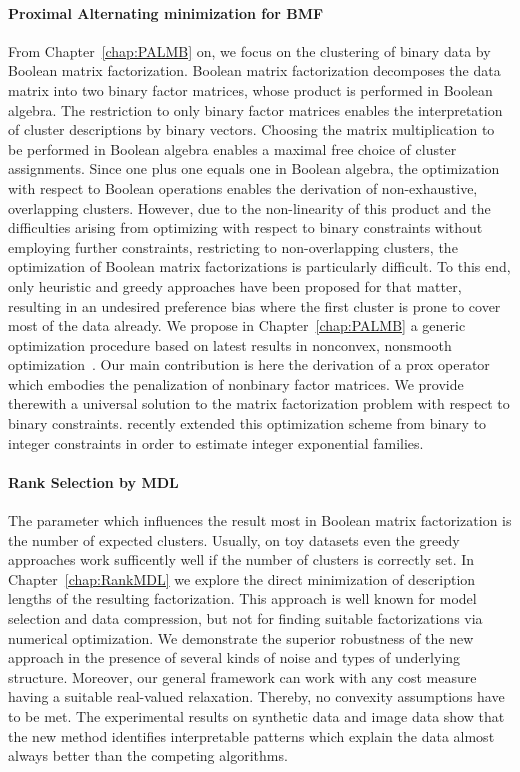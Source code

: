 \paragraph{Proximal Alternating minimization for BMF} From Chapter~\ref{chap:PALMB} on, we focus on the clustering of binary data by Boolean matrix factorization. Boolean matrix factorization decomposes the data matrix into two binary factor matrices, whose product is performed in Boolean algebra. The restriction to only binary factor matrices enables the interpretation of cluster descriptions by binary vectors. Choosing the matrix multiplication to be performed in Boolean algebra enables a maximal free choice of cluster assignments. Since one plus one equals one in Boolean algebra, the optimization with respect to Boolean operations enables the derivation of non-exhaustive, overlapping clusters. However, due to the non-linearity of this product and the difficulties arising from optimizing with respect to binary constraints without employing further constraints, restricting to non-overlapping clusters, the optimization of Boolean matrix factorizations is particularly difficult. To this end, only heuristic and greedy approaches have been proposed for that matter, resulting in an undesired preference bias where the first cluster is prone to cover most of the data already. We propose in Chapter~\ref{chap:PALMB} a generic optimization procedure based on latest results in nonconvex, nonsmooth optimization~\citep{hess2017primping}. Our main contribution is here the derivation of a prox operator which embodies the penalization of nonbinary factor matrices. We provide therewith a universal solution to the matrix factorization problem with respect to binary constraints. \cite{piatkowski2018exponential} recently  extended this optimization scheme from binary to integer constraints in order to estimate integer exponential families. 
\paragraph{Rank Selection by MDL} 
The parameter which influences the result most in Boolean matrix factorization is the number of expected clusters. Usually, on toy datasets even the greedy approaches work sufficently well if the number of clusters is correctly set. In Chapter~\ref{chap:RankMDL} we explore the direct minimization of description lengths of the resulting factorization. This approach is well known for model selection and data compression, but not for finding suitable factorizations via numerical optimization. 
We demonstrate the superior robustness of the new approach in the presence of several kinds of noise and types of underlying structure. 
Moreover, our general framework can work with any cost measure having a suitable real-valued relaxation. Thereby, no convexity assumptions have to be met. 
The experimental results on synthetic data and image data show that the new method identifies interpretable patterns 
which explain the data almost always better than the competing algorithms. 

